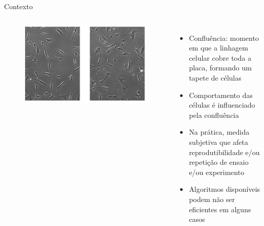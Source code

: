 \documentclass{beamer}
\begin{document}
\begin{frame}{Contexto}

   \begin{columns}
    \begin{figure}
      \includegraphics[width=1.1\textwidth]{imgs/cell-cont.png}
    \end{figure}

    \begin{itemize}
    \item Confluência: momento em que a linhagem celular cobre toda a placa,
      formando um tapete de células
      \vfill
    \item Comportamento das células é influenciado pela confluência
      \vfill
    \item Na prática, medida subjetiva que afeta reprodutibilidade e/ou repetição
      de ensaio e/ou experimento
    \item Algoritmos disponíveis podem não ser eficientes em alguns casos

    \end{itemize}
  \end{columns}
\end{frame}
\end{document}
